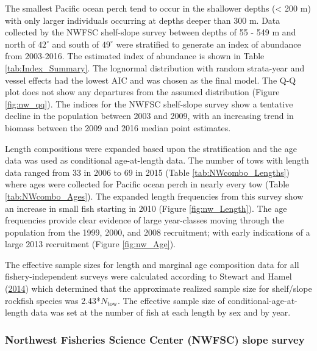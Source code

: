 \documentclass[12pt,]{article}
\begin{document}
The smallest Pacific ocean perch tend to occur in the shallower depths
(\textless{} 200 m) with only larger individuals occurring at depths
deeper than 300 m. Data collected by the NWFSC shelf-slope survey
between depths of 55 - 549 m and north of \(42^\circ\) and south of
\(49^\circ\) were stratified to generate an index of abundance from
2003-2016. The estimated index of abundance is shown in Table
\ref{tab:Index_Summary}. The lognormal distribution with random
strata-year and vessel effects had the lowest AIC and was chosen as the
final model. The Q-Q plot does not show any departures from the assumed
distribution (Figure \ref{fig:nw_qq}). The indices for the NWFSC
shelf-slope survey show a tentative decline in the population between
2003 and 2009, with an increasing trend in biomass between the 2009 and
2016 median point estimates.

Length compositions were expanded based upon the stratification and the
age data was used as conditional age-at-length data. The number of tows
with length data ranged from 33 in 2006 to 69 in 2015 (Table
\ref{tab:NWcombo_Lengths}) where ages were collected for Pacific ocean
perch in nearly every tow (Table \ref{tab:NWcombo_Ages}). The expanded
length frequencies from this survey show an increase in small fish
starting in 2010 (Figure \ref{fig:nw_Length}). The age frequencies
provide clear evidence of large year-classes moving through the
population from the 1999, 2000, and 2008 recruitment; with early
indications of a large 2013 recruitment (Figure \ref{fig:nw_Age}).

The effective sample sizes for length and marginal age composition data
for all fishery-independent surveys were calculated according to Stewart
and Hamel (\protect\hyperlink{ref-stewart_bootstrapping_2014}{2014})
which determined that the approximate realized sample size for
shelf/slope rockfish species was 2.43*\(N_{\text{tow}}\). The effective
sample size of conditional-age-at-length data was set at the number of
fish at each length by sex and by year.

\subsubsection{Northwest Fisheries Science Center (NWFSC) slope
survey}\label{northwest-fisheries-science-center-nwfsc-slope-survey}
\end{document}
